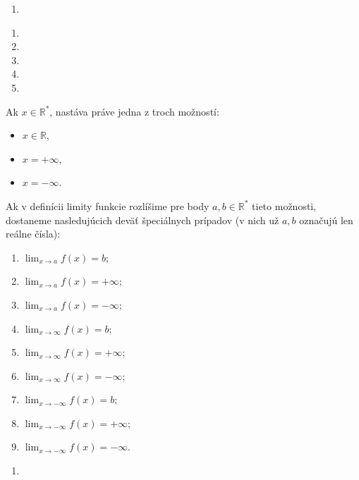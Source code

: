 \begin{enumerate}[resume]
  \item {}
\end{enumerate}

\begin{enumerate}[resume]
  \item {}
  \item {}
  \item {}
  \item {}
  \item {}
\end{enumerate}

Ak $x \in \mathbb{R^*}$, nastáva práve jedna z troch možností:
\begin{itemize}
\item $x \in \mathbb{R}$,
\item $x = +\infty$,
\item $x = -\infty$.
\end{itemize}

Ak v definícii limity funkcie rozlíšime pre body $a, b \in \mathbb{R^*}$ tieto
možnosti, dostaneme nasledujúcich deväť špeciálnych prípadov (v nich už $a, b$
označujú len reálne čísla):

\begin{multicols}{2}
\begin{enumerate}
    \item $\lim_{x \rightarrow a} f(x)=b$;
    \item $\lim_{x \rightarrow a} f(x)=+\infty$;
    \item $\lim_{x \rightarrow a} f(x)=-\infty$;
    \item $\lim_{x \rightarrow \infty} f(x)=b$;
    \item $\lim_{x \rightarrow \infty} f(x)=+\infty$;
    \item $\lim_{x \rightarrow \infty} f(x)=-\infty$;
    \item $\lim_{x \rightarrow -\infty} f(x)=b$;
    \item $\lim_{x \rightarrow -\infty} f(x)=+\infty$;
    \item $\lim_{x \rightarrow -\infty} f(x)=-\infty$.
\end{enumerate}
\end{multicols}

\begin{enumerate}[resume]
  \item {}
\end{enumerate}


